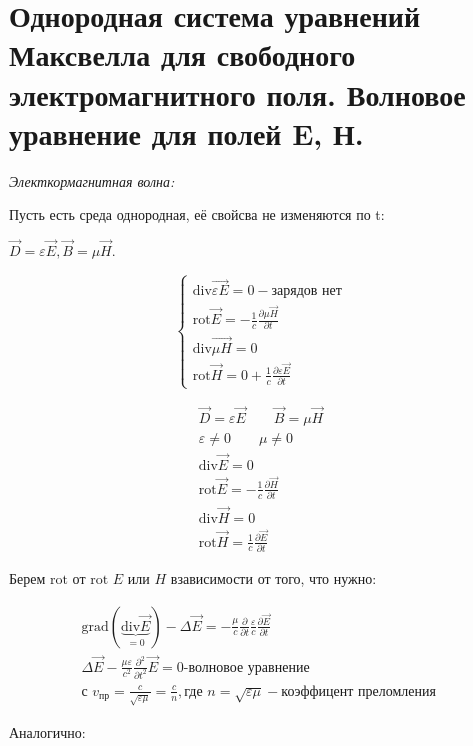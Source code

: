 \section{Однородная система уравнений Максвелла для свободного
электромагнитного поля. Волновое уравнение для полей E, Н.}

\textit{Электкормагнитная волна:}

Пусть есть среда однородная, её свойсва не изменяются по t: 

\( \vec{D}=\varepsilon\vec{E}, \vec{B}=\mu\vec{H} \).

\[
\begin{cases}
    \mathrm{div}\vec{\varepsilon E}=0 -\text{зарядов нет} \\
    \mathrm{rot}\vec{E}=-\frac{1}{c} \frac{\partial\mu\vec{H}}{\partial t} \\
    \mathrm{div}\vec{\mu H}=0 \\
    \mathrm{rot}\vec{H}=0+\frac{1}{c} \frac{\partial\varepsilon\vec{E}}{\partial t}  
\end{cases}
\]

\begin{gather*}
    \vec{D}=\varepsilon\vec{E} \qquad \vec{B}=\mu\vec{H} \\
    \varepsilon\neq0 \qquad \mu\neq0 \qquad \\
    \mathrm{div}\vec{E}=0 \\
    \mathrm{rot}\vec{E}=-\frac{1}{c} \frac{\partial\vec{H}}{\partial t} \\
    \mathrm{div}\vec{H}=0 \\
    \mathrm{rot}\vec{H}=\frac{1}{c} \frac{\partial\vec{E}}{\partial t}  
\end{gather*}

Берем \( \mathrm{rot}  \) от \( \mathrm{rot}  \) \( E \) или \( H \) взависимости от того, что нужно:

\begin{gather*}
    \mathrm{grad}(\underbrace{\mathrm{div}\vec{E} }_{=0})-\Delta\vec{E}=-\frac{\mu}{c}\frac{\partial}{\partial t} \frac{\varepsilon}{c}\frac{\partial\vec{E}}{\partial t} \\
    \Delta\vec{E}-\frac{\mu\varepsilon}{c^2}\frac{\partial^2}{\partial t^2}\vec{E}=0 \text{-волновое уравнение} \\
    \text{с } v_{\text{пр}}=\frac{c}{\sqrt{\varepsilon\mu}}=\frac{c}{n}, \text{где } n=\sqrt{\varepsilon\mu}-\text{коэффицент преломления }   
\end{gather*}

Аналогично: 

